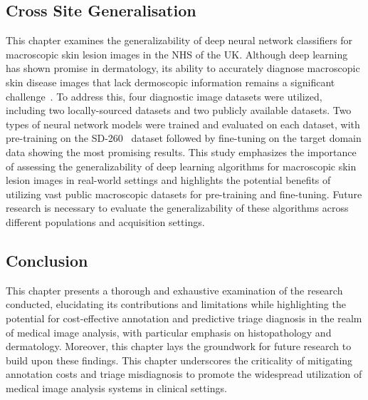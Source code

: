 \subsection*{Cross Site Generalisation}
This chapter examines the generalizability of deep neural network classifiers for macroscopic skin lesion images in the NHS of the UK. Although deep learning has shown promise in dermatology, its ability to accurately diagnose macroscopic skin disease images that lack dermoscopic information remains a significant challenge~\citep{jones2022artificial}. To address this, four diagnostic image datasets were utilized, including two locally-sourced datasets and two publicly available datasets. Two types of neural network models were trained and evaluated on each dataset, with pre-training on the SD-260~\citep{yang2019self} dataset followed by fine-tuning on the target domain data showing the most promising results. This study emphasizes the importance of assessing the generalizability of deep learning algorithms for macroscopic skin lesion images in real-world settings and highlights the potential benefits of utilizing vast public macroscopic datasets for pre-training and fine-tuning. Future research is necessary to evaluate the generalizability of these algorithms across different populations and acquisition settings.

\subsection*{Conclusion}
This chapter presents a thorough and exhaustive examination of the research conducted, elucidating its contributions and limitations while highlighting the potential for cost-effective annotation and predictive triage diagnosis in the realm of medical image analysis, with particular emphasis on histopathology and dermatology. Moreover, this chapter lays the groundwork for future research to build upon these findings. This chapter underscores the criticality of mitigating annotation costs and triage misdiagnosis to promote the widespread utilization of medical image analysis systems in clinical settings.